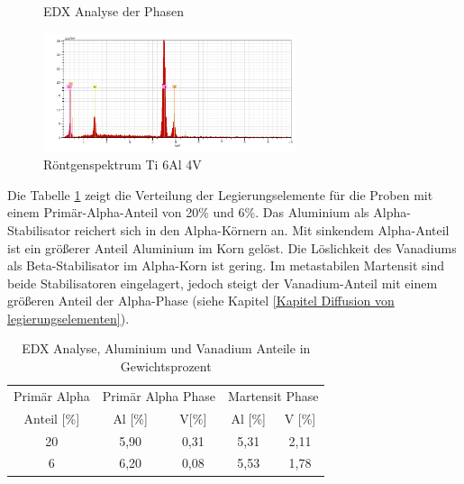 \documentclass[a4paper, 11pt]{tubsreprt}
\begin{document}
\begin{figure}
\caption{EDX Analyse der Phasen}
\label{EDX Analyse der Phasen}
\end{figure}
\begin{figure}
\centering
\includegraphics[width=0.66\textwidth]{Bilder/Roentgenspektrumti64.png}
\caption{Röntgenspektrum Ti 6Al 4V}
\label{Röntgenspektrum}
\end{figure}
\newpage
Die Tabelle \ref{Tabelle EDX Analyse} zeigt die Verteilung der Legierungselemente für die Proben mit einem Primär-Alpha-Anteil von 20\% und 6\%. Das Aluminium als Alpha-Stabilisator reichert sich in den Alpha-Körnern an. Mit sinkendem Alpha-Anteil ist ein größerer Anteil Aluminium im Korn gelöst. Die Löslichkeit des Vanadiums als Beta-Stabilisator im Alpha-Korn ist gering. Im metastabilen Martensit sind beide Stabilisatoren eingelagert, jedoch steigt der Vanadium-Anteil mit einem größeren Anteil der Alpha-Phase (siehe Kapitel \ref{Kapitel Diffusion von legierungselementen}).    
\begin{table}
\begin{tabular}{c|c|c|c|c}
Primär Alpha & \multicolumn{2}{c}{Primär Alpha Phase} & \multicolumn{2}{|c}{Martensit Phase} \\
\cline{2-5}
Anteil [\%] & Al [\%] & V[\%] & Al [\%] & V [\%] \\
\hline
20 & 5,90 & 0,31 & 5,31 & 2,11 \\
\hline
6 & 6,20 & 0,08 & 5,53 & 1,78 \\

\end{tabular}
\caption{EDX Analyse, Aluminium und Vanadium Anteile in Gewichtsprozent}
\label{Tabelle EDX Analyse}
\end{table}
\end{document}
